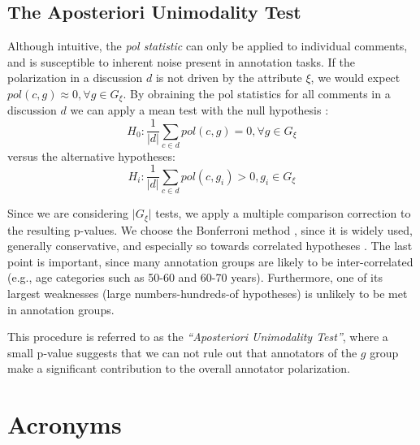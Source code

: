 \documentclass{article}
\begin{document}
\subsection{The Aposteriori Unimodality Test}
\label{ssec:methodology:aposteriori}

Although intuitive, the \textit{pol statistic} can only be applied to individual comments, and is susceptible to inherent noise present in annotation tasks. If the polarization in a discussion $d$ is not driven by the attribute $\xi$, we would expect $pol(c, g) \approx 0,  \forall g \in G_{\xi}$. By obraining the pol statistics for all comments in a discussion $d$ we can apply a mean test with the null hypothesis :
\begin{equation}
	H_0: \frac{1}{\lvert d \rvert} \sum\limits_{c \in d} pol(c, g) = 0, \forall g \in G_{\xi}
\end{equation}
\noindent versus the alternative hypotheses: 
\begin{equation}
	H_i:  \frac{1}{\lvert d \rvert} \sum\limits_{c \in d}  pol(c, g_i) > 0, g_i \in G_{\xi}
\end{equation}

Since we are considering $\lvert G_{\xi} \rvert$ tests, we apply a multiple comparison correction to the resulting p-values. We choose the Bonferroni method \parencite{Bland170}, since it is widely used, generally conservative, and especially so towards correlated hypotheses \parencite{ChenFengYi2017}. The last point is important, since many annotation groups are likely to be inter-correlated (e.g., age categories such as 50-60 and 60-70 years). Furthermore, one of its largest weaknesses (large numbers-hundreds-of hypotheses) is unlikely to be met in annotation groups.

This procedure is referred to as the \textit{``Aposteriori Unimodality Test''}, where a small p-value suggests that we can not rule out that annotators of the $g$ group make a significant contribution to the overall annotator polarization.


\section{Acronyms}

\begin{acronym}[WWW]
\end{acronym}

\printbibliography
\end{document}
